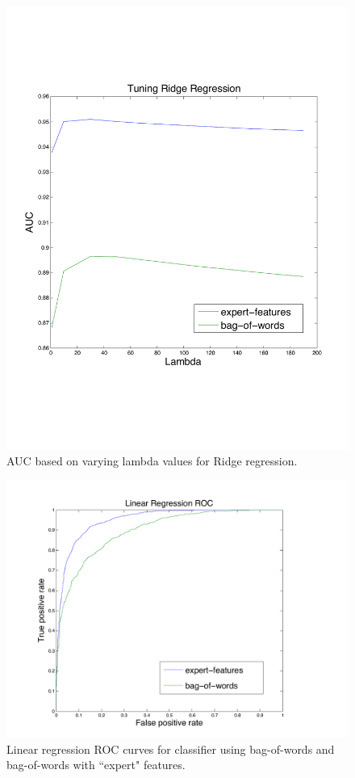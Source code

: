 \documentclass[preprint]{acm_proc_article-sp}
\begin{document}
\begin{figure}[h]
    \centering
    \includegraphics[width=\linewidth]{figures/linear-ridge.pdf}
    \caption{AUC based on varying lambda values for Ridge regression.}
    \label{fig:lambda}
\end{figure}

\begin{figure}[h]
    \centering
    \includegraphics[width=\linewidth]{figures/linear-roc.pdf}
    \caption{Linear regression ROC curves for classifier using bag-of-words and bag-of-words with ``expert" features.}
    \label{fig:roclin}
\end{figure}
\end{document}
